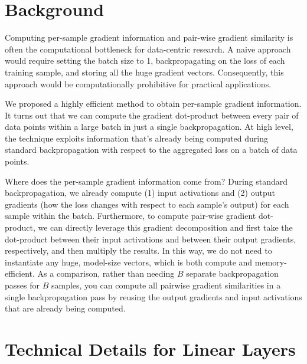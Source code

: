 \newcommand{\R}{\mathbb{R}}
\newcommand{\del}{\partial}
\newcommand{\bs}{\textbf{s}}
\newcommand{\ba}{\textbf{a}}
\newcommand{\bb}{\textbf{b}}
\newcommand{\bW}{\textbf{W}}
\newcommand{\outerprod}{\otimes}
\newcommand{\batch}{\mathcal{B}_t}
\newcommand{\zval}{z^{(\test)}}
\newcommand{\test}{\mathrm{val}}


\section{Background}
Computing per-sample gradient information and pair-wise gradient similarity is often the computational bottleneck for data-centric research. A naive approach would require setting the batch size to 1, backpropagating on the loss of each training sample, and storing all the huge gradient vectors. Consequently, this approach would be computationally prohibitive for practical applications. 

We proposed a highly efficient method to obtain per-sample gradient information. It turns out that we can compute the gradient dot-product between every pair of data points within a large batch in just a single backpropagation. At high level, the technique exploits information that's already being computed during standard backpropagation with respect to the aggregated loss on a batch of data points. 

Where does the per-sample gradient information come from? During standard backpropagation, we already compute (1) input activations and (2) output gradients (how the loss changes with respect to each sample's output) for each sample within the batch. Furthermore, to compute pair-wise gradient dot-product, we can directly leverage this gradient decomposition and first take the dot-product between their input activations and between their output gradients, respectively, and then multiply the results. In this way, we do not need to instantiate any huge, model-size vectors, which is both compute and memory-efficient. As a comparison, rather than needing $B$ separate backpropagation passes for $B$ samples, you can compute all pairwise gradient similarities in a single backpropagation pass by reusing the output gradients and input activations that are already being computed.


\section{Technical Details for Linear Layers}
\label{appendix:efficiency}


